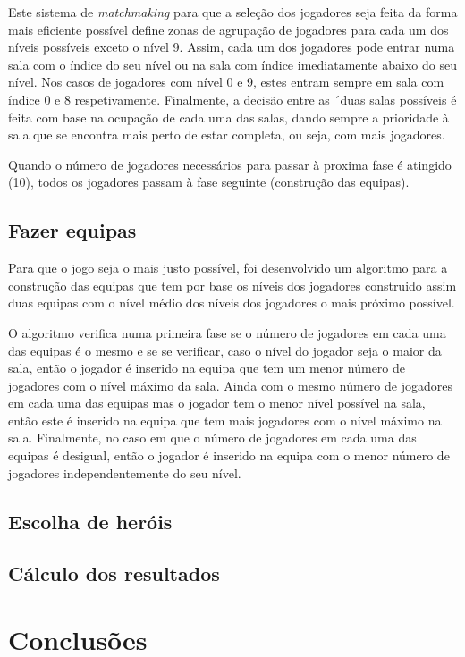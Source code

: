 \documentclass[a4paper]{article}
\begin{document}
\par Este sistema de \textit{matchmaking} para que a seleção dos jogadores seja feita da forma mais eficiente possível define zonas de agrupação de jogadores para cada um dos níveis possíveis exceto o nível 9. Assim, cada um dos jogadores pode entrar numa sala com o índice do seu nível ou na sala com índice imediatamente abaixo do seu nível. Nos casos de jogadores com nível 0 e 9, estes entram sempre em sala com índice 0 e 8 respetivamente. Finalmente, a decisão entre as ´duas salas possíveis é feita com base na ocupação de cada uma das salas, dando sempre a prioridade à sala que se encontra mais perto de estar completa, ou seja, com mais jogadores.

\par Quando o número de jogadores necessários para passar à proxima fase é atingido (10), todos os jogadores passam à fase seguinte (construção das equipas).


\subsection{Fazer equipas}
\label{sec:3.3}

\hspace{3mm} Para que o jogo seja o mais justo possível, foi desenvolvido um algoritmo para a construção das equipas que tem por base os níveis dos jogadores construido assim duas equipas com o nível médio dos níveis dos jogadores o mais próximo possível.

\par O algoritmo verifica numa primeira fase se o número de jogadores em cada uma das equipas é o mesmo e se se verificar, caso o nível do jogador seja o maior da sala, então o jogador é inserido na equipa que tem um menor número de jogadores com o nível máximo da sala. Ainda com o mesmo número de jogadores em cada uma das equipas mas o jogador tem o menor nível possível na sala, então este é inserido na equipa que tem mais jogadores com o nível máximo na sala. Finalmente, no caso em que o número de jogadores em cada uma das equipas é desigual, então o jogador é inserido na equipa com o menor número de jogadores independentemente do seu nível.

\subsection{Escolha de heróis}
\label{sec:3.4}
\hspace{3mm} 

\subsection{Cálculo dos resultados}
\label{sec:3.5}
\hspace{3mm} 

\pagebreak


\section{Conclusões}
\label{sec:4}

\hspace{3mm} 
\end{document}
